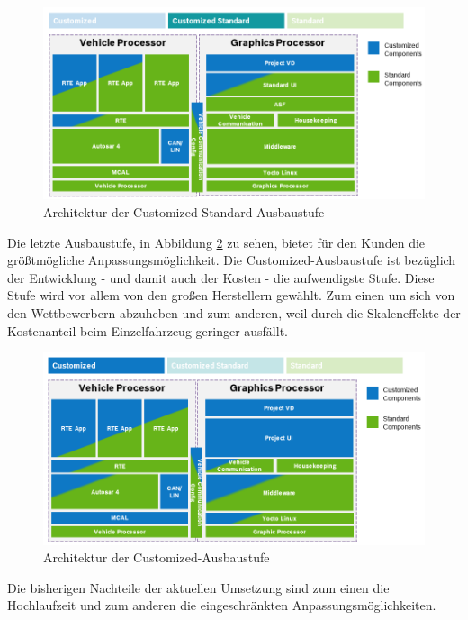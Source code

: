 \begin{figure}[htb]
	\centering
	\includegraphics[width=\textwidth]{img/2_stand_der_technik/STICC_2_neu}
	\caption[Architektur der Customized-Standard-Ausbaustufe]{Architektur der Customized-Standard-Ausbaustufe \cite{bosch}}
		\label{fig:cu_st}
	\end{figure}
	 
Die letzte Ausbaustufe, in Abbildung \ref{fig:customized} zu sehen, bietet für den Kunden die größtmögliche Anpassungsmöglichkeit. Die Customized-Ausbaustufe ist bezüglich der Entwicklung - und damit auch der Kosten - die aufwendigste Stufe. Diese Stufe wird vor allem von den großen Herstellern gewählt. Zum einen um sich von den Wettbewerbern abzuheben und zum anderen, weil durch die Skaleneffekte der Kostenanteil beim Einzelfahrzeug geringer ausfällt.

\begin{figure}[htb]
	\centering
	\includegraphics[width=\textwidth]{img/2_stand_der_technik/STICC_1_neu}
	\caption[Architektur der Customized-Ausbaustufe]{Architektur der Customized-Ausbaustufe \cite{bosch}}
	\label{fig:customized}
\end{figure}

Die bisherigen Nachteile der aktuellen Umsetzung sind zum einen die Hochlaufzeit und zum anderen die eingeschränkten Anpassungsmöglichkeiten.\\

